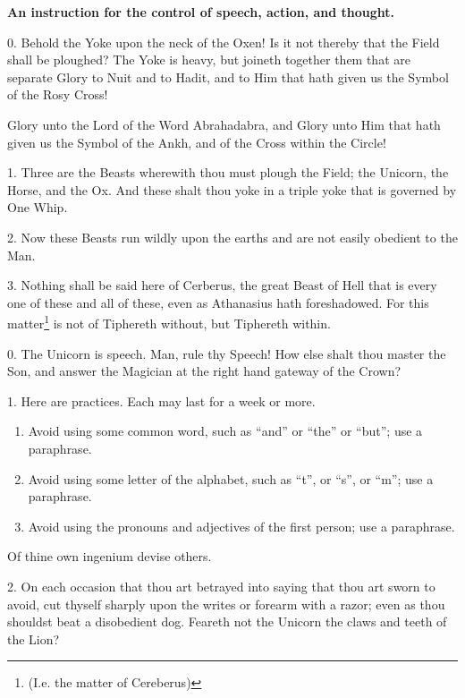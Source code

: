 
\textbf{An instruction for the control of speech, action, and thought.}


0. Behold the Yoke upon the neck of the Oxen! Is it not thereby that the Field shall be ploughed? The Yoke is heavy, but joineth together them that are separate \textemdash{} Glory to Nuit and to Hadit, and to Him that hath given us the Symbol of the Rosy Cross!

Glory unto the Lord of the Word Abrahadabra, and Glory unto Him that hath given us the Symbol of the Ankh, and of the Cross within the Circle!

1. Three are the Beasts wherewith thou must plough the Field; the Unicorn, the Horse, and the Ox. And these shalt thou yoke in a triple yoke that is governed by One Whip.

2. Now these Beasts run wildly upon the earths and are not easily obedient to the Man.

3. Nothing shall be said here of Cerberus, the great Beast of Hell that is every one of these and all of these, even as Athanasius hath foreshadowed. For this matter\footnote{(I.e. the matter of Cereberus)} is not of Tiphereth without, but Tiphereth within.

0. The Unicorn is speech. Man, rule thy Speech! How else shalt thou master the Son, and answer the Magician at the right hand gateway of the Crown?

1. Here are practices. Each may last for a week or more.
\begin{enumerate}[label=\greek*.]
\item Avoid using some common word, such as \enquote{and} or \enquote{the} or \enquote{but}; use a paraphrase.

\item Avoid using some letter of the alphabet, such as \enquote{t}, or \enquote{s}, or \enquote{m}; use a paraphrase.

\item Avoid using the pronouns and adjectives of the first person; use a paraphrase.
\end{enumerate}
Of thine own ingenium devise others.

2. On each occasion that thou art betrayed into saying that thou art sworn to avoid, cut thyself sharply upon the writes or forearm with a razor; even as thou shouldst beat a disobedient dog. Feareth not the Unicorn the claws and teeth of the Lion?

